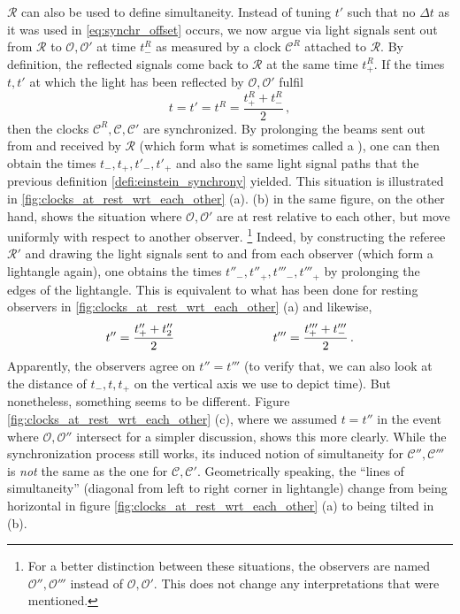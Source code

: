$\mathcal{R}$ can also be used to define simultaneity. Instead of tuning $t'$ such that no $\Delta t$ as it was used in \eqref{eq:synchr_offset} occurs, we now argue via light signals sent out from $\mathcal{R}$ to $\mathcal{O}, \mathcal{O}'$ at time $t^R_-$ as measured by a clock $\mathcal{C}^R$ attached to $\mathcal{R}$. By definition, the reflected signals come back to $\mathcal{R}$ at the same time $t^R_+$. If the times $t, t'$ at which the light has been reflected by $\mathcal{O}, \mathcal{O}'$ fulfil
\begin{equation}\label{eq:synchr_referee}
	t = t' = t^R = \frac{t^R_+ + t^R_-}{2} \, ,
\end{equation}
then the clocks $\mathcal{C}^R, \mathcal{C}, \mathcal{C}'$ are synchronized. By prolonging the beams sent out from and received by $\mathcal{R}$ (which form what is sometimes called a ), one can then obtain the times $t_-, t_+, t'_-, t'_+$ and also the same light signal paths that the previous definition \ref{defi:einstein_synchrony} yielded. This situation is illustrated in \ref{fig:clocks_at_rest_wrt_each_other} (a). (b) in the same figure, on the other hand, shows the situation where $\mathcal{O}, \mathcal{O}'$ are at rest relative to each other, but move uniformly with respect to another observer. \footnote{For a better distinction between these situations, the observers are named $\mathcal{O}'', \mathcal{O}'''$ instead of $\mathcal{O}, \mathcal{O}'$. This does not change any interpretations that were mentioned.} Indeed, by constructing the referee $\mathcal{R}'$ and drawing the light signals sent to and from each observer (which form a lightangle again), one obtains the times $t''_-, t''_+, t'''_-, t'''_+$ by prolonging the edges of the lightangle. This is equivalent to what has been done for resting observers in \ref{fig:clocks_at_rest_wrt_each_other} (a) and likewise,
\begin{equation}
	t'' = \frac{t''_+ + t''_2}{2}
	\qquad \qquad \qquad \qquad
	t''' = \frac{t'''_+ + t'''_-}{2}
	\, .
\end{equation}
Apparently, the observers agree on $ t'' = t'''$ (to verify that, we can also look at the distance of $t_-, t, t_+$ on the vertical axis we use to depict time). But nonetheless, something seems to be different. Figure \ref{fig:clocks_at_rest_wrt_each_other} (c), where we assumed $t = t''$ in the event where $\mathcal{O}, \mathcal{O}''$ intersect for a simpler discussion, shows this more clearly. While the synchronization process still works, its induced notion of simultaneity for $\mathcal{C}'', \mathcal{C}'''$ is \emph{not} the same as the one for $\mathcal{C}, \mathcal{C}'$. Geometrically speaking, the \enquote{lines of simultaneity} (diagonal from left to right corner in lightangle) change from being horizontal in figure \ref{fig:clocks_at_rest_wrt_each_other} (a) to being tilted in (b).



